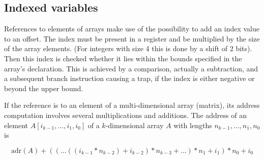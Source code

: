 \subsection{Indexed variables}
References to elements of arrays make use of the possibility to add an index value to an offset.
The index must be present in a register and be multiplied by the size of the array elements. (For
integers with size 4 this is done by a shift of 2 bits). Then this index is checked whether it lies
within the bounds specified in the array's declaration. This is achieved by a comparison, actually
a subtraction, and a subsequent branch instruction causing a trap, if the index is either negative
or beyond the upper bound.

If the reference is to an element of a multi-dimensional array (matrix), its address computation
involves several multiplications and additions. The address of an element $A[i_{k-1}, ..., i_1, i_0]$
of a $k$-dimensional array $A$ with lengths $n_{k-1}, ..., n_1, n_0$ is

\[ \text{adr}(A) + (( ... ((i_{k-1} * n_{k-2}) + i_{k-2}) * n_{k-3} + ... ) * n_1 + i_1) * n_0 + i_0 \]

